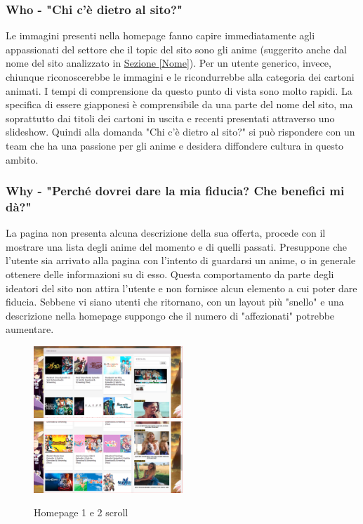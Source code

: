 \subsubsection{Who - "Chi c'è dietro al sito?"} \label{HWho}
Le immagini presenti nella homepage fanno capire immediatamente agli appassionati del settore che il topic del sito sono gli anime (suggerito anche dal nome del sito analizzato in \hyperref[Nome]{Sezione \ref{Nome}}). Per un utente generico, invece, chiunque riconoscerebbe le immagini e le ricondurrebbe alla categoria dei cartoni animati. I tempi di comprensione da questo punto di vista sono molto rapidi. La specifica di essere giapponesi è comprensibile da una parte del nome del sito, ma soprattutto dai titoli dei cartoni in uscita e recenti presentati attraverso uno slideshow. Quindi alla domanda "Chi c'è dietro al sito?" si può rispondere con un team che ha una passione per gli anime e desidera diffondere cultura in questo ambito.

\subsubsection{Why - "Perché dovrei dare la mia fiducia? Che benefici mi dà?"} \label{HWhy}
La pagina non presenta alcuna descrizione della sua offerta, procede con il mostrare una lista degli anime del momento e di quelli passati. Presuppone che l'utente sia arrivato alla pagina con l'intento di guardarsi un anime, o in generale ottenere delle informazioni su di esso. Questa comportamento da parte degli ideatori del sito non attira l'utente e non fornisce alcun elemento a cui poter dare fiducia. Sebbene vi siano utenti che ritornano, con un layout più "snello" e una descrizione nella homepage suppongo che il numero di "affezionati" potrebbe aumentare.

\begin{figure}[H]
	\includegraphics[width=0.5\textwidth]{img/hp02.png}
	\includegraphics[width=0.5\textwidth]{img/hp03.png}
	\caption{Homepage 1 e 2 scroll} 
	\label{img2} 
\end{figure}

